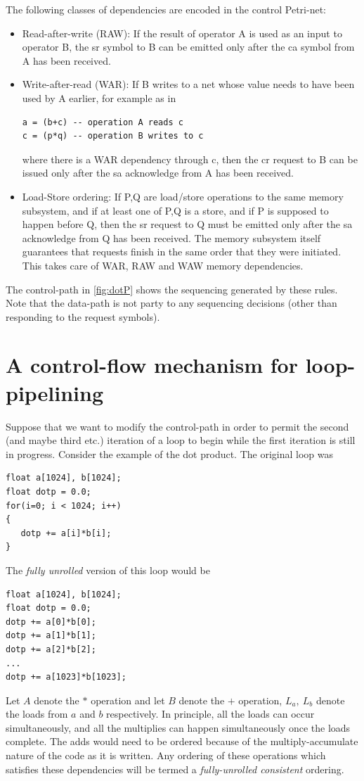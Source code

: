 \documentclass[conference]{IEEEtran}
\begin{document}
The following classes of dependencies are
encoded in the control Petri-net:
\begin{itemize}
\item Read-after-write (RAW):  If the result of operator A is used
as an input to operator B, the sr symbol to B can be emitted only after
the ca symbol from A has been received.
\item Write-after-read (WAR): If B writes to a net whose value needs
to have been used by A earlier, for example as in
\begin{verbatim}
a = (b+c) -- operation A reads c
c = (p*q) -- operation B writes to c
\end{verbatim}
where there is a WAR dependency through c,
 then the cr request to B can be
issued only after the sa acknowledge from A has been received.
\item Load-Store ordering:  If P,Q are load/store operations
to the same memory subsystem, and if at least one of P,Q is a
store, and if P is supposed to happen before Q,  then the sr request
to Q must be emitted only after the sa acknowledge from Q
has been received.  The memory subsystem itself guarantees
that requests finish in the same order that they were
initiated.  This takes care of WAR, RAW and WAW memory
dependencies.
\end{itemize}

The control-path in \ref{fig:dotP} shows the sequencing
generated by these rules.  Note that the data-path
is not party to any sequencing decisions (other than
responding to the request symbols). 

\section{A control-flow mechanism for loop-pipelining}

Suppose that we want to modify the control-path in order to
permit the second (and maybe third etc.) iteration of a loop
to begin while the first iteration is still in progress.  
Consider the example of the dot product.  The original
loop was
\begin{verbatim}
float a[1024], b[1024];
float dotp = 0.0;
for(i=0; i < 1024; i++)
{
   dotp += a[i]*b[i];
}
\end{verbatim}
The {\em fully unrolled} version of this loop would be
\begin{verbatim}
float a[1024], b[1024];
float dotp = 0.0;
dotp += a[0]*b[0];
dotp += a[1]*b[1];
dotp += a[2]*b[2];
...
dotp += a[1023]*b[1023];
\end{verbatim}
Let $A$ denote the $*$ operation and let $B$ denote the $+$
operation, $L_a,\ L_b$ denote the loads from $a$ and $b$ respectively.  
In principle, all the loads can occur simultaneously, and all the multiplies
can happen simultaneously once the loads complete.  The adds
would need to be ordered because of the multiply-accumulate nature
of the code as it is written.  Any ordering of these operations which
satisfies these dependencies will be termed a {\em fully-unrolled consistent}
ordering.
\end{document}
